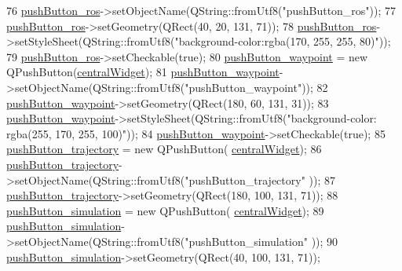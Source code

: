 \begin{DoxyCode}
76         \hyperlink{class_ui___main_window_a2667c2b4f9c61bf9895b73d07d4b5172}{pushButton\_ros}->setObjectName(QString::fromUtf8(\textcolor{stringliteral}{"pushButton\_ros"}));
77         \hyperlink{class_ui___main_window_a2667c2b4f9c61bf9895b73d07d4b5172}{pushButton\_ros}->setGeometry(QRect(40, 20, 131, 71));
78         \hyperlink{class_ui___main_window_a2667c2b4f9c61bf9895b73d07d4b5172}{pushButton\_ros}->setStyleSheet(QString::fromUtf8(\textcolor{stringliteral}{"background-color:rgba(170, 255, 255,
       80)"}));
79         \hyperlink{class_ui___main_window_a2667c2b4f9c61bf9895b73d07d4b5172}{pushButton\_ros}->setCheckable(\textcolor{keyword}{true});
80         \hyperlink{class_ui___main_window_a6b5d7c0f96cdb3276a33746fbcd7e8c7}{pushButton\_waypoint} = \textcolor{keyword}{new} QPushButton(\hyperlink{class_ui___main_window_a30075506c2116c3ed4ff25e07ae75f81}{centralWidget});
81         \hyperlink{class_ui___main_window_a6b5d7c0f96cdb3276a33746fbcd7e8c7}{pushButton\_waypoint}->setObjectName(QString::fromUtf8(\textcolor{stringliteral}{"pushButton\_waypoint"}));
82         \hyperlink{class_ui___main_window_a6b5d7c0f96cdb3276a33746fbcd7e8c7}{pushButton\_waypoint}->setGeometry(QRect(180, 60, 131, 31));
83         \hyperlink{class_ui___main_window_a6b5d7c0f96cdb3276a33746fbcd7e8c7}{pushButton\_waypoint}->setStyleSheet(QString::fromUtf8(\textcolor{stringliteral}{"background-color:
       rgba(255, 170, 255, 100)"}));
84         \hyperlink{class_ui___main_window_a6b5d7c0f96cdb3276a33746fbcd7e8c7}{pushButton\_waypoint}->setCheckable(\textcolor{keyword}{true});
85         \hyperlink{class_ui___main_window_a9d644554288462450d209192c1998095}{pushButton\_trajectory} = \textcolor{keyword}{new} QPushButton(
      \hyperlink{class_ui___main_window_a30075506c2116c3ed4ff25e07ae75f81}{centralWidget});
86         \hyperlink{class_ui___main_window_a9d644554288462450d209192c1998095}{pushButton\_trajectory}->setObjectName(QString::fromUtf8(\textcolor{stringliteral}{"pushButton\_trajectory"}
      ));
87         \hyperlink{class_ui___main_window_a9d644554288462450d209192c1998095}{pushButton\_trajectory}->setGeometry(QRect(180, 100, 131, 71));
88         \hyperlink{class_ui___main_window_afd109ead0ad1ae7ae67ad1df803c9c38}{pushButton\_simulation} = \textcolor{keyword}{new} QPushButton(
      \hyperlink{class_ui___main_window_a30075506c2116c3ed4ff25e07ae75f81}{centralWidget});
89         \hyperlink{class_ui___main_window_afd109ead0ad1ae7ae67ad1df803c9c38}{pushButton\_simulation}->setObjectName(QString::fromUtf8(\textcolor{stringliteral}{"pushButton\_simulation"}
      ));
90         \hyperlink{class_ui___main_window_afd109ead0ad1ae7ae67ad1df803c9c38}{pushButton\_simulation}->setGeometry(QRect(40, 100, 131, 71));

\end{DoxyCode}
